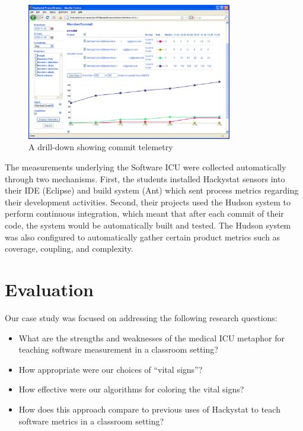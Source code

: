\documentclass{acm_proc_article-sp}
\begin{document}
\begin{figure}[ht]
  \center
  \includegraphics[width=0.8\textwidth]{telemetry-screen.eps}
  \caption{A drill-down showing commit telemetry}
  \label{fig:telemetry}
\end{figure} 

The measurements underlying the Software ICU were collected automatically
through two mechanisms. First, the students installed Hackystat sensors
into their IDE (Eclipse) and build system (Ant) which sent process
metrics regarding their development activities.  Second, their projects
used the Hudson system to perform continuous integration, which meant that
after each commit of their code, the system would be automatically built
and tested.  The Hudson system was also configured to automatically gather
certain product metrics such as coverage, coupling, and complexity.

\section{Evaluation}
\label{sec:evaluation}

Our case study was focused on addressing the following research questions: 
\begin{itemize}
\item What are the strengths and weaknesses of the medical ICU metaphor for 
teaching software measurement in a classroom setting? 
\item How appropriate were our choices of ``vital signs''?
\item How effective were our algorithms for coloring the vital signs? 
\item How does this approach compare to previous uses of Hackystat to teach software metrics
in a classroom setting? 
\end{itemize}
\end{document}
